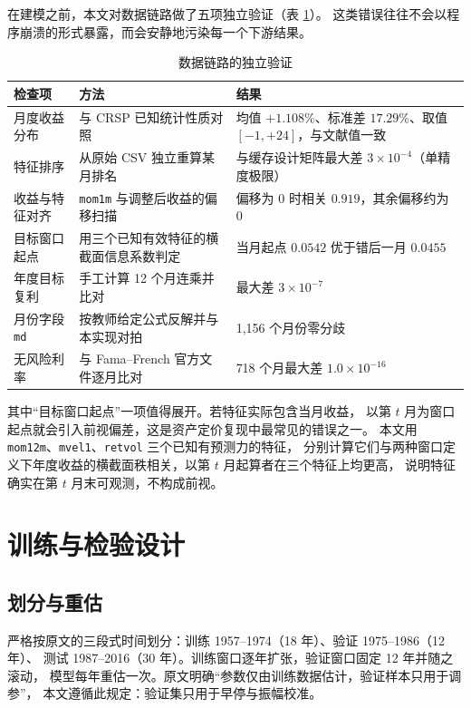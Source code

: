 \documentclass[11pt,a4paper,fontset=windows]{ctexart}
\newcommand{\code}[1]{\texttt{#1}}
\begin{document}
在建模之前，本文对数据链路做了五项独立验证（表 \ref{tab:audit}）。
这类错误往往不会以程序崩溃的形式暴露，而会安静地污染每一个下游结果。

\begin{table}[htbp]
\centering
\caption{数据链路的独立验证}
\label{tab:audit}
\small
\begin{tabular}{p{3.2cm}p{5.6cm}p{5.2cm}}
\toprule
检查项 & 方法 & 结果 \\
\midrule
月度收益分布 & 与 CRSP 已知统计性质对照 &
均值 $+1.108\%$、标准差 $17.29\%$、取值 $[-1,+24]$，与文献值一致 \\
特征排序 & 从原始 CSV 独立重算某月排名 &
与缓存设计矩阵最大差 $3\times10^{-4}$（单精度极限） \\
收益与特征对齐 & \code{mom1m} 与调整后收益的偏移扫描 &
偏移为 0 时相关 $0.919$，其余偏移约为 0 \\
目标窗口起点 & 用三个已知有效特征的横截面信息系数判定 &
当月起点 $0.0542$ 优于错后一月 $0.0455$ \\
年度目标复利 & 手工计算 12 个月连乘并比对 &
最大差 $3\times10^{-7}$ \\
月份字段 \code{md} & 按教师给定公式反解并与本实现对拍 &
1{,}156 个月份零分歧 \\
无风险利率 & 与 Fama--French 官方文件逐月比对 &
718 个月最大差 $1.0\times10^{-16}$ \\
\bottomrule
\end{tabular}
\end{table}

其中``目标窗口起点''一项值得展开。若特征实际包含当月收益，
以第 $t$ 月为窗口起点就会引入前视偏差，这是资产定价复现中最常见的错误之一。
本文用 \code{mom12m}、\code{mvel1}、\code{retvol} 三个已知有预测力的特征，
分别计算它们与两种窗口定义下年度收益的横截面秩相关，以第 $t$ 月起算者在三个特征上均更高，
说明特征确实在第 $t$ 月末可观测，不构成前视。

\section{训练与检验设计}\label{sec:design}

\subsection{划分与重估}

严格按原文的三段式时间划分：训练 1957--1974（18 年）、验证 1975--1986（12 年）、
测试 1987--2016（30 年）。训练窗口逐年扩张，验证窗口固定 12 年并随之滚动，
模型每年重估一次。原文明确``参数仅由训练数据估计，验证样本只用于调参''，
本文遵循此规定：验证集只用于早停与振幅校准。
\end{document}
